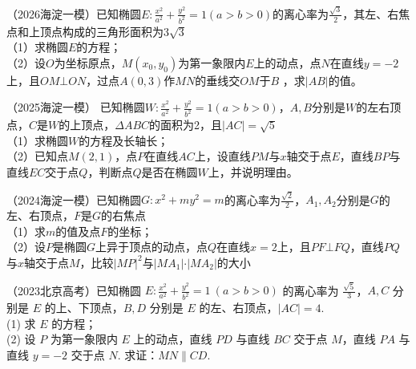 \begin{example}
（2026海淀一模）已知椭圆$E:\frac{x^2}{a^2}+\frac{y^2}{b^2}=1(a > b > 0)$的离心率为$\frac{\sqrt{3}}{2}$，其左、右焦点和上顶点构成的三角形面积为$3\sqrt{3}$ \\
（1）求椭圆$E$的方程；\\
（2）设$O$为坐标原点，$M(x_0, y_0)$为第一象限内$E$上的动点，点$N$在直线$y=-2$上，且$OM\bot ON$，过点$A(0,3)$作$MN$的垂线交$OM$于$B$ ，求$\vert AB \vert$的值。
\end{example}
\begin{property}
\vspace*{7\baselineskip}
\end{property}
\newpage
\begin{example}
（2025海淀一模）
已知椭圆$W:\frac{x^2}{a^2}+\frac{y^2}{b^2}=1(a > b > 0)$，$A, B$分别是$W$的左右顶点，$C$是$W$的上顶点，$\Delta ABC$的面积为2，且$\vert AC \vert = \sqrt{5}$ \\
（1）求椭圆$W$的方程及长轴长；\\
（2）已知点$M(2,1)$，点$P$在直线$AC$上，设直线$PM$与$x$轴交于点$E$，直线$BP$与直线$EC$交于点$Q$，判断点$Q$是否在椭圆$W$上，并说明理由。
\end{example}
\begin{property}
\vspace*{15\baselineskip}
\end{property}
\begin{example}
（2024海淀一模）已知椭圆$G: x^2 + my^2 =m$的离心率为$\frac{\sqrt{2}}{2}$，$A_1, A_2$分别是$G$的左、右顶点，$F$是$G$的右焦点\\
（1）求$m$的值及点$F$的坐标；\\
（2）设$P$是椭圆$G$上异于顶点的动点，点$Q$在直线$x = 2$上，且$PF \bot FQ$，直线$PQ$与$x$轴交于点$M$，比较$\vert MP \vert ^2$与$\vert MA_1\vert \cdot \vert MA_2 \vert$的大小

\end{example}
\begin{property}
\vspace*{15\baselineskip}
\end{property}
\newpage
\begin{example}
（2023北京高考）已知椭圆 $E:\frac{x^2}{a^2}+\frac{y^2}{b^2}=1\ (a>b>0)$ 的离心率为 $\frac{\sqrt{5}}{3}$，$A,C$ 分别是 $E$ 的上、下顶点，$B,D$ 分别是 $E$ 的左、右顶点，$\lvert AC\rvert=4$.\\
(1) 求 $E$ 的方程；\\
(2) 设 $P$ 为第一象限内 $E$ 上的动点，直线 $PD$ 与直线 $BC$ 交于点 $M$，直线 $PA$ 与直线 $y=-2$ 交于点 $N$. 求证：$MN\parallel CD$.
\end{example}
\begin{property}
\vspace*{15\baselineskip}
\end{property}
